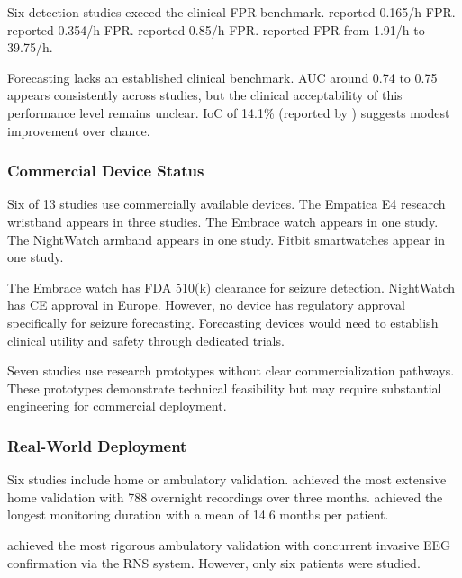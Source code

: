 Six detection studies exceed the clinical FPR benchmark. \textcite{dongTwoLayerEnsembleMethod2022} reported 0.165/h FPR. \textcite{wangEpilepticSeizureDetection2025} reported 0.354/h FPR. \textcite{odeDevelopmentEpilepticSeizure2023} reported 0.85/h FPR. \textcite{reintjesECGBasedDetectionEpileptic2025} reported FPR from 1.91/h to 39.75/h.

Forecasting lacks an established clinical benchmark. AUC around 0.74 to 0.75 appears consistently across studies, but the clinical acceptability of this performance level remains unclear. IoC of 14.1\% (reported by \textcite{meiselMachineLearningWristband2020}) suggests modest improvement over chance.

\subsubsection{Commercial Device Status}

Six of 13 studies use commercially available devices. The Empatica E4 research wristband appears in three studies. The Embrace watch appears in one study. The NightWatch armband appears in one study. Fitbit smartwatches appear in one study.

The Embrace watch has FDA 510(k) clearance for seizure detection. NightWatch has CE approval in Europe. However, no device has regulatory approval specifically for seizure forecasting. Forecasting devices would need to establish clinical utility and safety through dedicated trials.

Seven studies use research prototypes without clear commercialization pathways. These prototypes demonstrate technical feasibility but may require substantial engineering for commercial deployment.

\subsubsection{Real-World Deployment}

Six studies include home or ambulatory validation. \textcite{dongTwoLayerEnsembleMethod2022} achieved the most extensive home validation with 788 overnight recordings over three months. \textcite{stirlingForecastingSeizureLikelihood2021} achieved the longest monitoring duration with a mean of 14.6 months per patient.

\textcite{nasseriAmbulatorySeizureForecasting2021} achieved the most rigorous ambulatory validation with concurrent invasive EEG confirmation via the RNS system. However, only six patients were studied.

